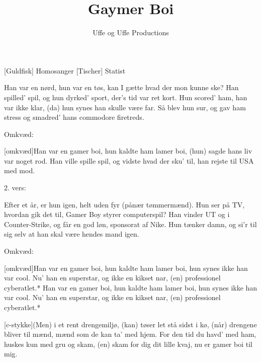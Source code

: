 \documentclass[a4paper,11pt]{article}
\title{Gaymer Boi}
\author{Uffe og Uffe Productions}
\begin{document}
\maketitle

\begin{roles}
[Guldfisk] Homosanger 
[Tischer] Statist
\end{roles}

\begin{props}
\end{props}

  
\begin{song}


Han var en nørd, hun var en tøs,
kan I gætte hvad der mon kunne ske?
Han spilled' spil, og hun dyrked' sport,
der's tid var ret kort.
Hun scored' ham, han var ikke klar,                        
(da) hun synes han skulle være far.
Så blev hun sur, og gav ham stress                         
og smadred' hans commodore firetreds.

Omkvæd:

[omkvæd]Han var en gamer boi, hun kaldte ham lamer boi,   
(hun) sagde hans liv var noget rod.
Han ville spille spil, og vidste hvad der sku' til,        
han rejste til USA med mod.

2. vers:

Efter et år, er hun igen,                                 
helt uden fyr (pånær tømmermænd).
Hun ser på TV, hvordan gik det til,                        
Gamer Boy styrer computerspil?
Han vinder UT og i Counter-Strike,                         
og får en god løn, sponsorat af Nike.
Hun tænker damn, og si'r til sig selv                     
at han skal være hendes mand igen.

Omkvæd:

[omkvæd]Han var en gamer boi, hun kaldte ham lamer boi,           
hun synes ikke han var cool.
Nu' han en superstar, og ikke en kikset nar,              
(en) professionel cyberatlet.*
Han var en gamer boi, hun kaldte ham lamer boi, 
hun synes ikke han var cool.
Nu' han en superstar, og ikke en kikset nar,              
(en) professionel cyberatlet.*


[c-stykke](Men) i et rent drengemiljø,        
(kan) tøser let stå sidst i kø,
(når) drengene bliver til mænd,                        
mænd som de kan ta' med hjem.
For den tid du havd' med ham,                            
huskes kun med gru og skam,
(en) skam for dig dit lille kvaj,                          
nu er gamer boi til mig.



\end{song}
\end{document}
